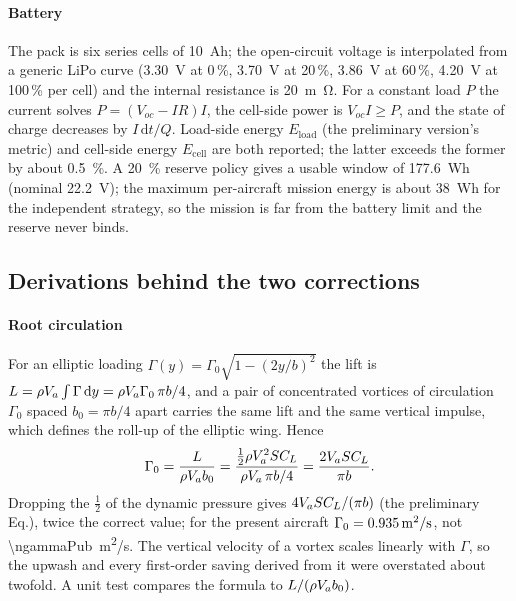 \paragraph{Battery} The pack is six series cells of \SI{10}{Ah}; the open-circuit voltage is interpolated from a generic LiPo curve (\SI{3.30}{V} at 0\,\%, \SI{3.70}{V} at 20\,\%, \SI{3.86}{V} at 60\,\%, \SI{4.20}{V} at 100\,\% per cell) and the internal resistance is \SI{20}{m\ohm}. For a constant load $P$ the current solves $P=(V_{oc}-IR)I$, the cell-side power is $V_{oc}I\ge P$, and the state of charge decreases by $I\,\mathrm{d}t/Q$. Load-side energy $E_{\mathrm{load}}$ (the preliminary version's metric) and cell-side energy $E_{\mathrm{cell}}$ are both reported; the latter exceeds the former by about \SI{0.5}{\percent}. A \SI{20}{\percent} reserve policy gives a usable window of \SI{177.6}{Wh} (nominal \SI{22.2}{V}); the maximum per-aircraft mission energy is about \SI{38}{Wh} for the independent strategy, so the mission is far from the battery limit and the reserve never binds.

\subsection{Derivations behind the two corrections}\label{sec:derivations}
\paragraph{Root circulation} For an elliptic loading $\Gamma(y)=\Gamma_0\sqrt{1-(2y/b)^2}$ the lift is $L=\rho V_a\int\Gamma\,\mathrm{d}y=\rho V_a\Gamma_0\,\pi b/4$, and a pair of concentrated vortices of circulation $\Gamma_0$ spaced $b_0=\pi b/4$ apart carries the same lift and the same vertical impulse, which defines the roll-up of the elliptic wing. Hence
\begin{equation}\Gamma_0=\frac{L}{\rho V_a b_0}=\frac{\tfrac12\rho V_a^2SC_L}{\rho V_a\,\pi b/4}=\frac{2V_a SC_L}{\pi b}.\end{equation}
Dropping the $\tfrac12$ of the dynamic pressure gives $4V_a SC_L/(\pi b)$ (the preliminary Eq.), twice the correct value; for the present aircraft $\Gamma_0=\SI{0.935}{m^2/s}$, not \SI{\ngammaPub}{m^2/s}. The vertical velocity of a vortex scales linearly with $\Gamma$, so the upwash and every first-order saving derived from it were overstated about twofold. A unit test compares the formula to $L/(\rho V_a b_0)$.

